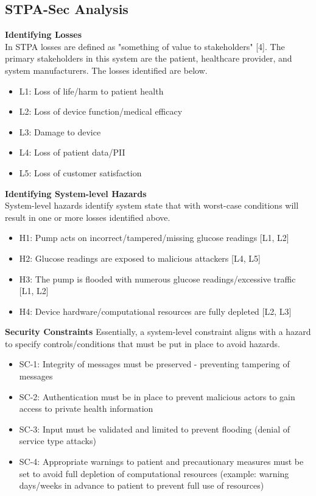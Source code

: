 \documentclass[conference]{IEEEtran}
\begin{document}
\subsection{STPA-Sec Analysis}
\vspace{.2cm}
\textbf{Identifying Losses}\\
In STPA losses are defined as "something of value to stakeholders" [4]. The primary stakeholders in this system are the patient, healthcare provider, and system manufacturers. The losses identified are below.
\begin{itemize}
    \item L1: Loss of life/harm to patient health
    \item L2: Loss of device function/medical efficacy
    \item L3: Damage to device
    \item L4: Loss of patient data/PII
    \item L5: Loss of customer satisfaction
\end{itemize}
\vspace{.2cm}
\textbf{Identifying System-level Hazards}\\
System-level hazards identify system state that with worst-case conditions will result in one or more losses identified above.
\begin{itemize}
    \item H1: Pump acts on incorrect/tampered/missing glucose readings [L1, L2]
    \item H2: Glucose readings are exposed to malicious attackers [L4, L5]
    \item H3: The pump is flooded with numerous glucose readings/excessive traffic [L1, L2]
    \item H4: Device hardware/computational resources are fully depleted [L2, L3]
\end{itemize}
\textbf{Security Constraints}
Essentially, a system-level constraint aligns with a hazard to specify controls/conditions that must be put in place to avoid hazards. 
\begin{itemize}
    \item SC-1: Integrity of messages must be preserved - preventing tampering of messages 
    \item SC-2: Authentication must be in place to prevent malicious actors to gain access to private health information
    \item SC-3: Input must be validated and limited to prevent flooding (denial of service type attacks)
    \item SC-4: Appropriate warnings to patient and precautionary measures must be set to avoid full depletion of computational resources (example: warning days/weeks in advance to patient to prevent full use of resources)
\end{itemize}
\end{document}
